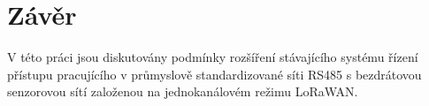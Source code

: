 \chapter{Závěr}

V této práci jsou diskutovány podmínky rozšíření stávajícího systému řízení přístupu pracujícího v průmyslově standardizované síti RS485 s bezdrátovou senzorovou sítí založenou na jednokanálovém režimu LoRaWAN.




